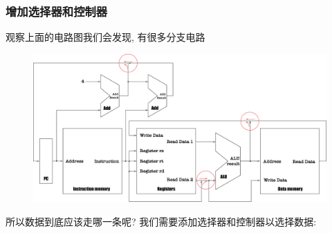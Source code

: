 \subsubsection{增加选择器和控制器}
观察上面的电路图我们会发现, 有很多分支电路
\begin{figure}[H]
\centering
\includegraphics[scale=.3]{img/figure31.pdf}
\end{figure}
所以数据到底应该走哪一条呢? 我们需要添加选择器和控制器以选择数据:
